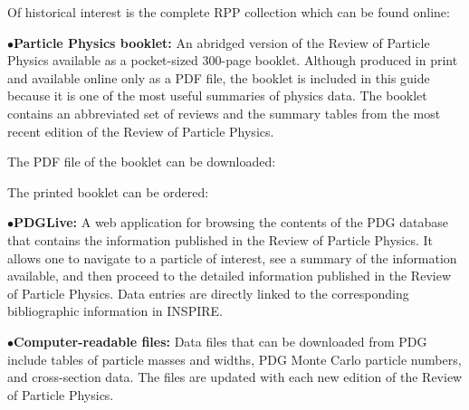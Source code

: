 \item{} Of historical interest is the complete RPP collection which can be found online:

         \item{}

\medskip

\item{$\bullet$}{\bf Particle Physics booklet:}
An abridged version of the Review of Particle Physics available as a pocket-sized 300-page booklet. Although produced in print and available online only as a PDF file, the booklet is included in this guide because it is one of the most useful summaries of physics data. The booklet contains an abbreviated set of reviews and the summary tables from the most recent edition of the Review of Particle Physics.

\item{} The PDF file of the booklet can be downloaded: 

         \item{}

\item{} The printed booklet can be ordered: 

         \item{}


\medskip

\item{$\bullet$}{\bf PDGLive:}
A web application for browsing the contents of the PDG database that contains the information published in the Review of Particle Physics. It allows one to navigate to a particle of interest, see a summary of the information available, and then proceed to the detailed information published in the Review of Particle Physics. Data entries are directly linked to the corresponding bibliographic information in INSPIRE.

    \item{}


\medskip



\item{$\bullet$}{\bf Computer-readable files:}
Data files that can be downloaded from PDG include tables of particle masses and widths, PDG Monte Carlo particle numbers, and cross-section data. The files are updated with each new edition of the Review of Particle Physics. 

